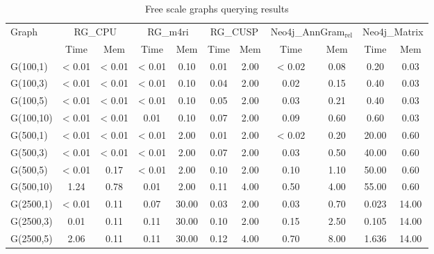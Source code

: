 \begin{table*}[h]
\caption{Free scale graphs querying results}
\label{tbl:tableFreeScale}
\begin{tabular}{| l | c  c | c  c | c  c | c  c | c  c |}
    \hline
    \multirow{2}{*}{Graph} & \multicolumn{2}{|c|}{RG\_CPU} & \multicolumn{2}{|c|}{RG\_m4ri} & \multicolumn{2}{|c|}{RG\_CUSP} &\multicolumn{2}{|c|}{Neo4j\_AnnGram$_{\text{rel}}$} &\multicolumn{2}{|c|}{Neo4j\_Matrix} \\
    \cline{2-11}
                  & Time     & Mem             & Time   & Mem          & Time     & Mem         & Time    & Mem         & Time    & Mem\\
    \hline
    \hline
    G(100,1)      & < 0.01  & < 0.01           & < 0.01  & 0.10        & 0.01   & 2.00          & < 0.02  & 0.08      & 0.20     & 0.03  \\
    G(100,3)      & < 0.01  & < 0.01           & < 0.01  & 0.10        & 0.04   & 2.00          & 0.02    & 0.15      & 0.40     & 0.03  \\
    G(100,5)      & < 0.01  & < 0.01           & < 0.01  & 0.10        & 0.05   & 2.00          & 0.03    & 0.21      & 0.40     & 0.03  \\
    G(100,10)     & < 0.01  & < 0.01           & 0.01    & 0.10        & 0.07   & 2.00          & 0.09    & 0.60      & 0.60     & 0.03  \\
    \hline
    G(500,1)      & < 0.01  & < 0.01           & < 0.01  & 2.00        & 0.01   & 2.00          & < 0.02  & 0.20      & 20.00    & 0.60   \\
    G(500,3)      & < 0.01  & < 0.01           & < 0.01  & 2.00        & 0.07   & 2.00          & 0.03    & 0.50      & 40.00    & 0.60   \\
    G(500,5)      & < 0.01  & 0.17             & < 0.01  & 2.00        & 0.10   & 2.00          & 0.10    & 1.10      & 50.00    & 0.60   \\
    G(500,10)     & 1.24    & 0.78             & 0.01    & 2.00        & 0.11  & 4.00           & 0.50    & 4.00      & 55.00    & 0.60   \\
    \hline
    G(2500,1)     & < 0.01  & 0.11             & 0.07    & 30.00       & 0.03   & 2.00          & 0.03    & 0.70       & 0.023   & 14.00  \\
    G(2500,3)     & 0.01    & 0.11             & 0.11    & 30.00       & 0.10   & 2.00          & 0.15    & 2.50       & 0.105   & 14.00  \\
    G(2500,5)     & 2.06    & 0.11             & 0.11    & 30.00       & 0.12   & 4.00          & 0.70    & 8.00       & 1.636   & 14.00  \\

\end{tabular}
\end{table*}
